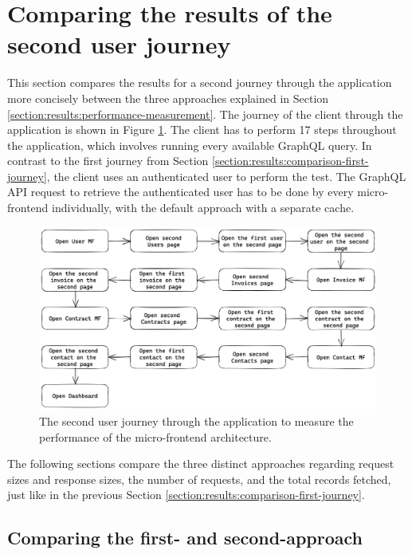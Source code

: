 \section{Comparing the results of the second user journey}\label{section:results:comparison-second-journey}

This section compares the results for a second journey through the application more concisely between the three approaches explained in Section \ref{section:results:performance-measurement}. The journey of the client through the application is shown in Figure \ref{fig:results:evaluation-second-path}. The client has to perform 17 steps throughout the application, which involves running every available GraphQL query. In contrast to the first journey from Section \ref{section:results:comparison-first-journey}, the client uses an authenticated user to perform the test. The GraphQL \ac{API} request to retrieve the authenticated user has to be done by every micro-frontend individually, with the default approach with a separate cache.

\ifshowImages
\begin{figure}[H]
\centering
\includegraphics[width=1\linewidth]{images/results/evaluation-second-path.png}
\caption{The second user journey through the application to measure the performance of the micro-frontend architecture.}\label{fig:results:evaluation-second-path}
\end{figure}
\fi

\noindent The following sections compare the three distinct approaches regarding request sizes and response sizes, the number of requests, and the total records fetched, just like in the previous Section \ref{section:results:comparison-first-journey}.

\subsection{Comparing the first- and second-approach}\label{subsection:results:comparison-second-path-first-second-approach}

